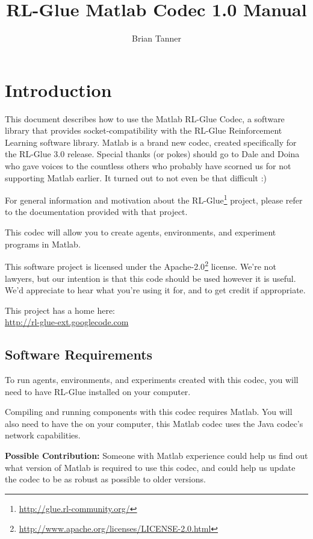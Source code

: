 \documentclass[11pt]{article}
\title{RL-Glue Matlab Codec 1.0 Manual }
\author{Brian Tanner}
\date{}
\begin{document}
\maketitle
\tableofcontents

\section{Introduction}

This document describes how to use the Matlab RL-Glue Codec, a software library that provides socket-compatibility with the RL-Glue Reinforcement Learning software library.  Matlab is a brand new codec, created specifically for the RL-Glue 3.0 release.  Special thanks (or pokes) should go to Dale and Doina who gave voices to the countless others who probably
have scorned us for not supporting Matlab earlier.  It turned out to not even be that difficult :)

For general information and motivation about the RL-Glue\footnote{\url{http://glue.rl-community.org/}} project, please refer to the documentation provided with that project.

This codec will allow you to create agents, environments, and experiment programs in Matlab.

This software project is licensed under the Apache-2.0\footnote{\url{http://www.apache.org/licenses/LICENSE-2.0.html}} license. We're not lawyers, but our intention is that this code 
should be used however it is useful.  We'd appreciate to hear what you're using it for, and to get credit if appropriate.

This project has a home here:\\
\url{http://rl-glue-ext.googlecode.com}


\subsection{Software Requirements}
To run agents, environments, and experiments created with this codec, you will need to have RL-Glue installed on your computer.

Compiling and running components with this codec requires Matlab.  You will also need to have the  on your computer, this Matlab codec uses
the Java codec's network capabilities.

\textbf{Possible Contribution: }Someone with Matlab experience could help us find out what version of Matlab is required to use this codec, and could help us update the codec
to be as robust as possible to older versions.
\end{document}
